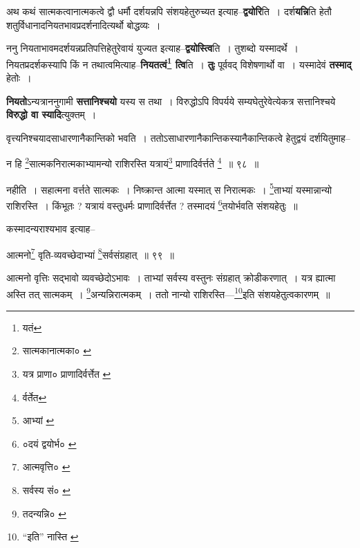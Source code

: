 \documentclass[article,12pt,a4paper]{memoir}
\begin{document}
	  \pstart अथ कथं सात्मकत्वानात्मकत्वे द्वौ धर्मौ दर्शयन्नपि संशयहेतुरुच्यत इत्याह--\textbf{द्वयोरि}ति । दर्श\leavevmode{}\textbf{यन्नि}ति हेतौ शतुर्विधानादनियतभावप्रदर्शनादित्यर्थो बोद्धव्यः ।
	\pend
      

	  \pstart ननु नियताभावमदर्शयन्नप्रतिपत्तिहेतुरेवायं युज्यत इत्याह--\textbf{द्वयोस्त्वि}ति । तुशब्दो यस्मादर्थे । नियतप्रदर्शकस्यापि किं न तथात्वमित्याह--\textbf{नियतत्वं\footnote{यतं} त्वि}ति । \textbf{तुः} पूर्ववद् विशेषणार्थो वा । यस्मादेवं \textbf{तस्माद्} हेतोः ।
	\pend
      

	  \pstart \textbf{नियतो}ऽन्यत्राननुगामी \textbf{सत्तानिश्चयो} यस्य स तथा । विरुद्धोऽपि विपर्यये सम्यघेतुरेवेत्येकत्र सत्तानिश्चये \textbf{विरुद्धो वा स्यादि}त्युक्तम् ।
	\pend
      \leavevmode{}
	  \bigskip
	  \begingroup
	

	  \pstart वृत्त्यनिश्चयादसाधारणानैकान्तिको भवति । ततोऽसाधारणानैकान्तिकस्यानैकान्तिकत्वे हेतुद्वयं दर्शयितुमाह--
	\pend
       
	  \bigskip
	  \begingroup
	

	  \pstart न हि \footnote{सात्मकानात्मका० \cite{dp-msC}}सात्मकनिरात्मकाभ्यामन्यो राशिरस्ति यत्रायं\footnote{यत्र प्राणा० \cite{dp-msD} \cite{dp-msB} \cite{dp-edP} \cite{dp-edH} \cite{dp-edE} \cite{dp-edN} प्राणादिर्वर्त्तेत \cite{dp-edN}} प्राणादिर्वर्त्तते \footnote{र्वर्तेत} ॥ ९८ ॥
	\pend
      
	  \endgroup
	 

	  \pstart नहीति । सहात्मना वर्त्तते सात्मकः । निष्क्रान्त आत्मा यस्मात् स निरात्मकः । \footnote{आभ्यां \cite{dp-msD}}ताभ्यां यस्मान्नान्यो राशिरस्ति । किंभूतः ? यत्रायं वस्तुधर्मः प्राणादिर्वर्त्तेत ? तस्मादयं \footnote{०दयं द्वयोर्भ० \cite{dp-msC}}तयोर्भवति संशयहेतुः ॥
	\pend
       

	  \pstart कस्मादन्यराश्यभाव इत्याह--
	\pend
       
	  \bigskip
	  \begingroup
	

	  \pstart आत्मनो\footnote{आत्मवृत्ति० \cite{dp-msC}} वृति-व्यवच्छेदाभ्यां \footnote{सर्वस्य सं० \cite{dp-msC}}सर्वसंग्रहात् ॥ ९९ ॥
	\pend
      
	  \endgroup
	 

	  \pstart आत्मनो वृत्तिः सद्भावो व्यवच्छेदोऽभावः । ताभ्यां सर्वस्य वस्तुनः संग्रहात् क्रोडीकरणात् । यत्र ह्यात्मा अस्ति तत् सात्मकम् । \footnote{तदन्यन्नि० \cite{dp-msA} \cite{dp-msB} \cite{dp-edP} \cite{dp-edH} \cite{dp-edN}}अन्यन्निरात्मकम् । ततो नान्यो राशिरस्ति—\footnote{“इति” नास्ति \cite{dp-msA} \cite{dp-msB} \cite{dp-msC} \cite{dp-msD} \cite{dp-edP} \cite{dp-edH} \cite{dp-edN}}इति संशयहेतुत्वकारणम् ॥
	\pend
      
\end{document}
